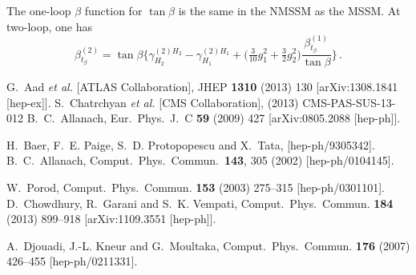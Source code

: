 \documentclass[final,3p,times,pdflatex]{elsarticle}
\newcommand{\be}{\begin{equation}}
\newcommand{\ee}{\end{equation}}
\begin{document}
The one-loop $\beta$ function for $\tan\beta$ is the same in the NMSSM as the MSSM.  At two-loop, one has
%
\be
\beta^{(2)}_{t_\beta} = \tan\beta\Bigg\{\gamma^{(2)H_2}_{H_2} - 
\gamma^{(2)H_1}_{H_1} + \Big(\tfrac{3}{10}g_1^2 + \tfrac{3}{2}g_2^2\Big)
\frac{\beta^{(1)}_{t_\beta}}{\tan\beta}\Bigg\}\,.
\ee


\begin{thebibliography}{10}
  G.~Aad {\it et al.}  [ATLAS Collaboration],
  JHEP {\bf 1310} (2013) 130
  [arXiv:1308.1841 [hep-ex]].
S.~Chatrchyan {\it et al.} [CMS Collaboration], (2013) CMS-PAS-SUS-13-012
  B.~C.~Allanach,
  Eur.\ Phys.\ J.\ C {\bf 59} (2009) 427
  [arXiv:0805.2088 [hep-ph]].

H.~Baer, F.~E. Paige, S.~D. Protopopescu and X.~Tata, 
[hep-ph/9305342].
  B.~C.~Allanach,
  Comput.\ Phys.\ Commun.\  {\bf 143}, 305 (2002)
  [hep-ph/0104145].

W.~Porod, 
  Comput.\ Phys.\ Commun. {\bf 153} (2003) 275--315
  [hep-ph/0301101].
D.~Chowdhury, R.~Garani and S.~K. Vempati, 
Comput.\ Phys.\ Commun. {\bf 184} (2013) 899--918
  [arXiv:1109.3551 [hep-ph]].

A.~Djouadi, J.-L. Kneur and G.~Moultaka, 
  Comput.\ Phys.\ Commun. {\bf 176} (2007) 426--455
  [hep-ph/0211331].


\end{thebibliography}
\end{document}
